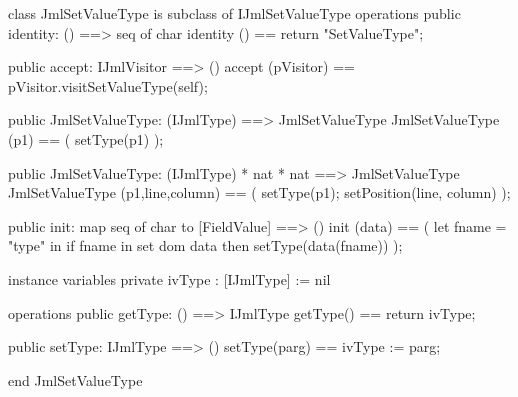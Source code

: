 \begin{vdm_al}
class JmlSetValueType is subclass of IJmlSetValueType
operations
  public identity: () ==> seq of char
  identity () == return "SetValueType";

  public accept: IJmlVisitor ==> ()
  accept (pVisitor) == pVisitor.visitSetValueType(self);

  public JmlSetValueType:
    (IJmlType) ==> JmlSetValueType
  JmlSetValueType (p1) == 
    ( setType(p1) );

  public JmlSetValueType:
    (IJmlType) *
    nat *
    nat ==> JmlSetValueType
  JmlSetValueType (p1,line,column) == 
    ( setType(p1);
      setPosition(line, column) );

  public init: map seq of char to [FieldValue] ==> ()
  init (data) ==
    ( let fname = "type" in
        if fname in set dom data
        then setType(data(fname)) );

instance variables
  private ivType : [IJmlType] := nil

operations
  public getType: () ==> IJmlType
  getType() == return ivType;

  public setType: IJmlType ==> ()
  setType(parg) == ivType := parg;

end JmlSetValueType
\end{vdm_al}

